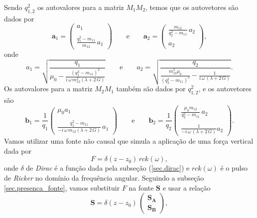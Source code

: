 Sendo $q^2_{1,2}$ os autovalores para a matriz $M_1M_2$, temos que os autovetores s\~ao dados por
\begin{equation*}
\mathbf{a}_1=\begin{pmatrix}
a_1\\\\
\frac{q_1^2-m_{11}}{m_{12}}\,a_1
\end{pmatrix}\qquad\text{e}\qquad
\mathbf{a}_2=\begin{pmatrix}
\frac{m_{12}}{q_2^2-m_{11}}\,a_2\\\\
a_2
\end{pmatrix},
\end{equation*}
onde
\begin{equation*}
a_1=\sqrt{\frac{q_1}{\mu_0-\frac{(q_1^2-m_{11})^2}{i\,\omega\,m_{12}^2(\lambda+2\,G)}}}\qquad\text{e}\qquad 
a_2=\sqrt{\frac{q_2}{\frac{m_{12}^2\mu_0}{(q_2^2-m_{11})^2}-\frac{1}{i\,\omega\,(\lambda+2\,G)}}}.
\end{equation*}
Os autovalores para a matriz $M_2M_1$ tamb\'em s\~ao dados por $q_{1,2}^2$, e os autovetores s\~ao
\begin{equation*}
\mathbf{b}_1=\frac{1}{q_1}\begin{pmatrix}
\mu_0a_1\\\\
\frac{q_1^2-m_{11}}{-i\,\omega\,m_{12}(\lambda+2\,G)}\,a_1
\end{pmatrix}\qquad\text{e}\qquad
\mathbf{b}_2=\frac{1}{q_2}\begin{pmatrix}
\frac{\mu_0m_{12}}{q_2^2-m_{11}}\,a_2\\\\
\frac{1}{-i\,\omega\,(\lambda+2\,G)}a_2
\end{pmatrix}.
\end{equation*}
Vamos utilizar uma fonte n\~ao causal que simula a aplica\c{c}\~ao de uma for\c{c}a vertical dada por
\begin{equation*}
F=\delta(z-z_0)\,rck(\omega),
\end{equation*}
onde $\delta$ de \textit{Dirac} \'e a fun\c{c}\~ao dada pela subse\c{c}\~ao (\ref{sec.dirac}) e $rck(\omega)$ \'e o pulso de \textit{Ricker} no dom\'inio da frequ\^encia angular. Seguindo a subse\c{c}\~ao \ref{sec.presenca_fonte}, vamos substituir $F$ na fonte $\mathbf{S}$ e usar a rela\c{c}\~ao
\begin{equation*}
\mathbf{S}=\delta(z-z_0)\,\begin{pmatrix}
\mathbf{S_A}\\
\mathbf{S_B}
\end{pmatrix},
\end{equation*}
